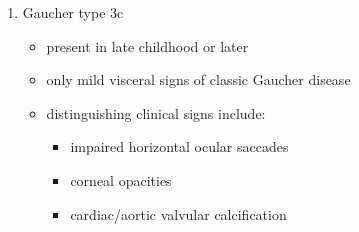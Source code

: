 \documentclass{scrartcl}
\begin{document}
\begin{enumerate}
\begin{enumerate}
\item Gaucher type 3c
\label{sec:org8842559}
\begin{itemize}
\item present in late childhood or later
\item only mild visceral signs of classic Gaucher disease
\item distinguishing clinical signs include:
\begin{itemize}
\item impaired horizontal ocular saccades
\item corneal opacities
\item cardiac/aortic valvular calcification
\end{itemize}
\end{itemize}
\end{enumerate}
\end{enumerate}
\end{document}
